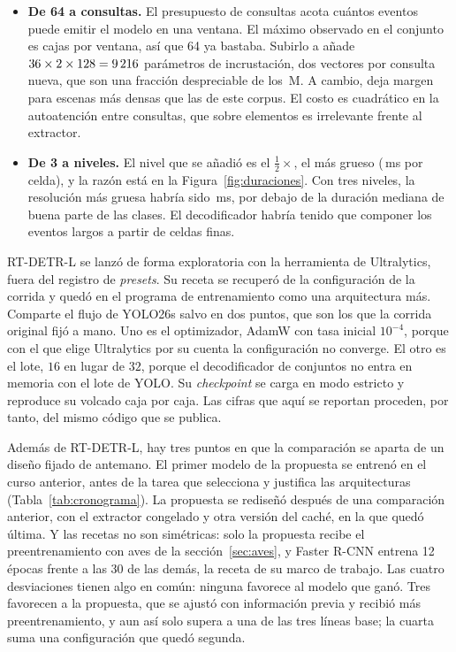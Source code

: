 \begin{itemize}[nosep]
    \item \textbf{De 64 a \mQueries{} consultas.} El presupuesto de consultas
          acota cuántos eventos puede emitir el modelo en una ventana. El máximo
          observado en el conjunto es \maxPerWindow{} cajas por ventana, así
          que 64 ya bastaba. Subirlo a \mQueries{} añade
          $36 \times 2 \times 128 = 9\,216$ parámetros de incrustación, dos
          vectores por consulta nueva, que son una fracción despreciable de los
          \mParams{}\,M. A cambio, deja margen para escenas más densas que las
          de este corpus. El costo es cuadrático en la
          autoatención entre consultas, que sobre \mQueries{} elementos es
          irrelevante frente al extractor.
    \item \textbf{De 3 a \mLevels{} niveles.} El nivel que se añadió es el
          $\tfrac{1}{2}\times$, el más grueso (\mCellThree{}\,ms por celda), y la
          razón está en la Figura~\ref{fig:duraciones}. Con tres niveles, la
          resolución más gruesa habría sido \mCellTwo{}\,ms, por debajo de la
          duración mediana de buena parte de las clases. El decodificador habría
          tenido que componer los eventos largos a partir de celdas finas.
\end{itemize}

 RT-DETR-L se lanzó de
forma exploratoria con la herramienta de Ultralytics, fuera del registro de
\textit{presets}. Su receta se recuperó de la configuración de la corrida y quedó
en el programa de entrenamiento como una arquitectura más. Comparte el flujo de
YOLO26s salvo en dos puntos, que son los que la corrida original fijó a mano. Uno
es el optimizador, AdamW con tasa inicial \(10^{-4}\), porque con el que elige
Ultralytics por su cuenta la configuración no converge. El otro es el lote,
\(16\) en lugar de \(32\), porque el decodificador de conjuntos no entra en
memoria con el lote de YOLO. Su \textit{checkpoint} se carga en modo estricto y
reproduce su volcado caja por caja. Las cifras que aquí se reportan proceden, por
tanto, del mismo código que se publica.

 Además de RT-DETR-L, hay tres
puntos en que la comparación se aparta de un diseño fijado de antemano. El primer
modelo de la propuesta se entrenó en el curso anterior, antes de la tarea que
selecciona y justifica las arquitecturas (Tabla~\ref{tab:cronograma}). La
propuesta se rediseñó después de una comparación anterior, con el extractor
congelado y otra versión del caché, en la que quedó última. Y las recetas no son
simétricas: solo la propuesta recibe el preentrenamiento con aves de la
sección~\ref{sec:aves}, y Faster R-CNN entrena 12 épocas frente a las
30 de las demás, la receta de su marco de trabajo. Las cuatro desviaciones
tienen algo en común: ninguna favorece al modelo que ganó. Tres favorecen a la
propuesta, que se ajustó con información previa y recibió más preentrenamiento, y
aun así solo supera a una de las tres líneas base; la cuarta suma una
configuración que quedó segunda.

